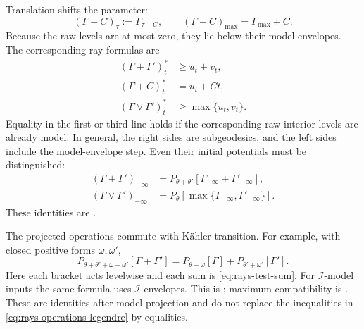 Translation shifts the parameter:
\[
              (\Gamma+C)_\tau:=\Gamma_{\tau-C},
\qquad
              (\Gamma+C)_{\max}=\Gamma_{\max}+C.
\tag{52.24}\label{eq:rays-test-translation}
\]
Because the raw levels are at most zero, they lie below their model
envelopes. The corresponding ray formulas are
\[
 \begin{split}
 (\Gamma+\Gamma')_t^*&\geq u_t+v_t,\\
 (\Gamma+C)_t^*&=u_t+Ct,\\
 (\Gamma\vee\Gamma')_t^*&\geq\max\{u_t,v_t\}.
 \end{split}
\tag{52.25}\label{eq:rays-operations-legendre}
\]
Equality in the first or third line holds if the corresponding
raw interior levels are already model.
In general, the right sides are subgeodesics, and the left sides
include the model-envelope step.
Even their initial potentials must be distinguished:
\[
 \begin{split}
 (\Gamma+\Gamma')_{-\infty}
   &=P_{\theta+\theta'}[\Gamma_{-\infty}+\Gamma'_{-\infty}],\\
 (\Gamma\vee\Gamma')_{-\infty}
   &=P_\theta[\max\{\Gamma_{-\infty},\Gamma'_{-\infty}\}].
 \end{split}
\]
These identities are
\cite[Proposition~9.4.1, Corollary~9.4.1]{XiaBook}.

The projected operations commute with K\"ahler transition.
For example, with closed positive forms $\omega,\omega'$,
\[
 P_{\theta+\theta'+\omega+\omega'}[\Gamma+\Gamma']
 =P_{\theta+\omega}[\Gamma]+P_{\theta'+\omega'}[\Gamma'].
\tag{52.25a}\label{eq:rays-sum-transition}
\]
Here each bracket acts levelwise and each sum is
\eqref{eq:rays-test-sum}.
For $\mathcal I$-model inputs the same formula uses
$\mathcal I$-envelopes.
This is \cite[Lemma~9.4.3]{XiaBook}; maximum compatibility is
\cite[Lemma~9.4.5]{XiaBook}.
These are identities after model projection and do not replace
the inequalities in \eqref{eq:rays-operations-legendre} by equalities.

